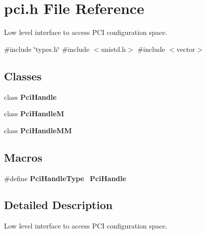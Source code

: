 \section{pci.\+h File Reference}
\label{pci_8h}


Low level interface to access P\+CI configuration space.  


{\ttfamily \#include \char`\"{}types.\+h\char`\"{}}\newline
{\ttfamily \#include $<$unistd.\+h$>$}\newline
{\ttfamily \#include $<$vector$>$}\newline
\subsection*{Classes}
\begin{DoxyCompactItemize}
\item 
class \textbf{ Pci\+Handle}
\item 
class \textbf{ Pci\+HandleM}
\item 
class \textbf{ Pci\+Handle\+MM}
\end{DoxyCompactItemize}
\subsection*{Macros}
\begin{DoxyCompactItemize}
\item 
\mbox{\label{pci_8h_a2537cf94c470359cabd6ed4ac9d46b69}} 
\#define {\bfseries Pci\+Handle\+Type}~\textbf{ Pci\+Handle}
\end{DoxyCompactItemize}


\subsection{Detailed Description}
Low level interface to access P\+CI configuration space. 

